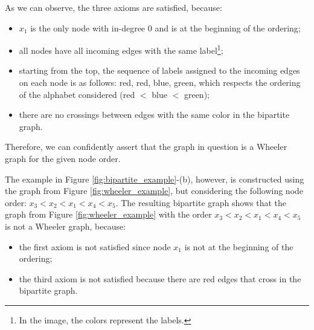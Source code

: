As we can observe, the three axioms are satisfied, because:
\begin{itemize}
    \item $x_1$ is the only node with in-degree $0$ and is at the beginning of the ordering;
    \item all nodes have all incoming edges with the same label\footnote{In the image, the colors represent the labels.};
    \item starting from the top, the sequence of labels assigned to the incoming edges on each node is as follows: red, red, blue, green, which respects the ordering of the alphabet considered (red $<$ blue $<$ green);
    \item there are no crossings between edges with the same color in the bipartite graph.
\end{itemize}
Therefore, we can confidently assert that the graph in question is a Wheeler graph for the given node order.

The example in Figure \ref{fig:bipartite_example}-(b), however, is constructed using the graph from Figure \ref{fig:wheeler_example}, but considering the following node order: $x_3<x_2<x_1<x_4<x_5$. The resulting bipartite graph shows that the graph from Figure \ref{fig:wheeler_example} with the order $x_3<x_2<x_1<x_4<x_5$ is not a Wheeler graph, because:
\begin{itemize}
    \item the first axiom is not satisfied since node $x_1$ is not at the beginning of the ordering;
    \item the third axiom is not satisfied because there are red edges that cross in the bipartite graph.
\end{itemize}
